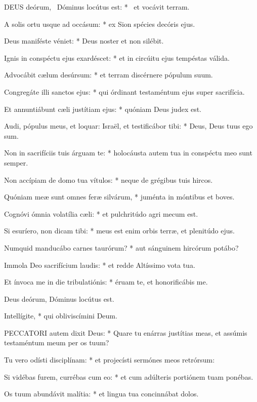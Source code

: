 
\lettrine[lines=2]{D}{EUS} deórum, \textdagger\ Dóminus locútus est: * \textdaggerdbl\ et vocávit terram.

A solis ortu usque ad occásum: * ex Sion spécies decóris ejus.

Deus maniféste véniet: * Deus noster et non silébit.

Ignis in conspéctu ejus exardéscet: * et in circúitu ejus tempéstas válida.

Advocábit cælum desúrsum: * et terram discérnere pópulum suum.

Congregáte illi sanctos ejus: * qui órdinant testaméntum ejus super sacrifícia.

Et annuntiábunt cæli justítiam ejus: * quóniam Deus judex est.

Audi, pópulus meus, et loquar: Israël, et testificábor tibi: * Deus, Deus tuus ego sum.

Non in sacrifíciis tuis árguam te: * holocáusta autem tua in conspéctu meo sunt semper.

Non accípiam de domo tua vítulos: * neque de grégibus tuis hircos.

Quóniam meæ sunt omnes feræ silvárum, * juménta in móntibus et boves.

Cognóvi ómnia volatília cæli: * et pulchritúdo agri mecum est.

Si esuríero, non dicam tibi: * meus est enim orbis terræ, et plenitúdo ejus.

Numquid manducábo carnes taurórum? * aut sánguinem hircórum potábo?

Immola Deo sacrifícium laudis: * et redde Altíssimo vota tua.

Et ínvoca me in die tribulatiónis: * éruam te, et honorificábis me.

 Deus deórum, Dóminus locútus est.

 Intellígite, * qui obliviscímini Deum.


\lettrine[lines=2]{P}{ECCATORI} autem dixit Deus: * Quare tu enárras justítias meas, et assúmis testaméntum meum per os tuum?

Tu vero odísti disciplínam: * et projecísti sermónes meos retrórsum:

Si vidébas furem, currébas cum eo: * et cum adúlteris portiónem tuam ponébas.

Os tuum abundávit malítia: * et lingua tua concinnábat dolos.


